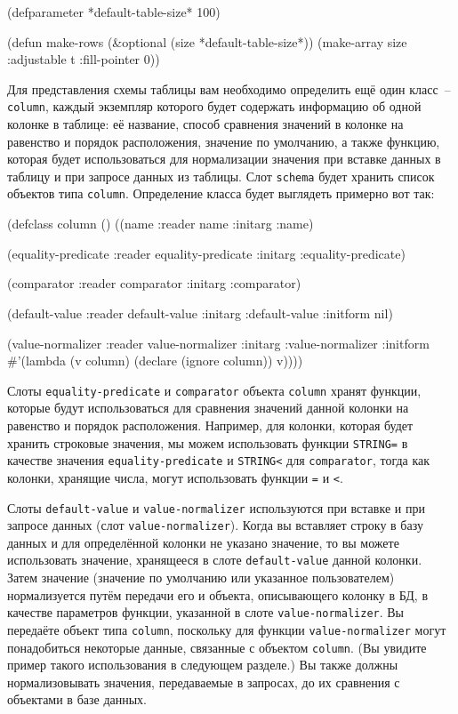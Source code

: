 \begin{myverb}
(defparameter *default-table-size* 100)

(defun make-rows (&optional (size *default-table-size*))
  (make-array size :adjustable t :fill-pointer 0))
\end{myverb}

Для представления схемы таблицы вам необходимо определить ещё один класс~--
\lstinline{column}, каждый экземпляр которого будет содержать информацию об одной колонке в
таблице: её название, способ сравнения значений в колонке на равенство и порядок
расположения, значение по умолчанию, а также функцию, которая будет использоваться для
нормализации значения при вставке данных в таблицу и при запросе данных из таблицы. Слот
\lstinline{schema} будет хранить список объектов типа \lstinline{column}.  Определение класса будет
выглядеть примерно вот так:

\begin{myverb}
(defclass column ()
  ((name               
    :reader name
    :initarg :name)

   (equality-predicate
    :reader equality-predicate
    :initarg :equality-predicate)

   (comparator
    :reader comparator
    :initarg :comparator)

   (default-value
    :reader default-value
    :initarg :default-value
    :initform nil)

   (value-normalizer
    :reader value-normalizer
    :initarg :value-normalizer
    :initform #'(lambda (v column) (declare (ignore column)) v))))
\end{myverb}

Слоты \lstinline{equality-predicate} и \lstinline{comparator} объекта \lstinline{column} хранят функции,
которые будут использоваться для сравнения значений данной колонки на равенство и порядок
расположения.  Например, для колонки, которая будет хранить строковые значения, мы можем
использовать функции \lstinline{STRING=} в качестве значения \lstinline{equality-predicate} и
\lstinline{STRING<} для \lstinline{comparator}, тогда как колонки, хранящие числа, могут
использовать функции \lstinline{=} и \lstinline!<!.

Слоты \lstinline{default-value} и \lstinline{value-normalizer} используются при вставке и при
запросе данных (слот \lstinline{value-normalizer}).  Когда вы вставляет строку в базу данных и
для определённой колонки не указано значение, то вы можете использовать значение,
хранящееся в слоте \lstinline{default-value} данной колонки.  Затем значение (значение по
умолчанию или указанное пользователем) нормализуется путём передачи его и объекта,
описывающего колонку в БД, в качестве параметров функции, указанной в слоте
\lstinline{value-normalizer}.  Вы передаёте объект типа \lstinline{column}, поскольку для функции
\lstinline{value-normalizer} могут понадобиться некоторые данные, связанные с объектом
\lstinline{column}. (Вы увидите пример такого использования в следующем разделе.)  Вы также
должны нормализовывать значения, передаваемые в запросах, до их сравнения с объектами в
базе данных.

